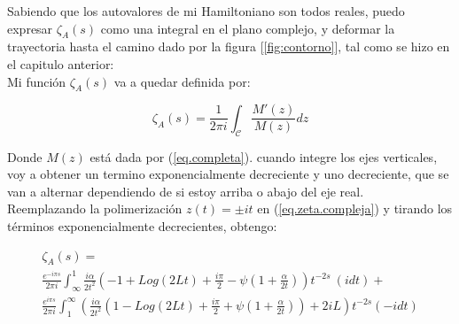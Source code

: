 Sabiendo que los autovalores de mi Hamiltoniano son todos reales, puedo expresar $\zeta _A (s)$ como una integral en el plano complejo, y deformar la trayectoria hasta el camino dado por la figura [\ref{fig:contorno}], tal como se hizo en el capitulo anterior: \\

Mi función $ \zeta _A (s) $ va a quedar definida por:

\begin{equation}
\zeta _A (s) = 
\frac{1}{2 \pi i} 
\int _{\mathcal{C}}
\frac{M ' ( z ) }{ M ( z ) } d z
\label{eq.zeta.compleja}
\end{equation}

Donde $M ( z )$ está dada por (\ref{eq.completa}).
cuando integre los ejes verticales, voy a obtener un termino exponencialmente decreciente y uno decreciente, que se van a alternar dependiendo de si estoy arriba o abajo del eje real. \\

Reemplazando la polimerización $ z (t) = \pm i t$ en (\ref{eq.zeta.compleja}) y tirando los términos exponencialmente decrecientes, obtengo:

\begin{comment}

\begin{equation}
\begin{array}{c}
    \zeta _A (s) = \\
     \frac{1}{2 \pi i} \int _{\infty} ^{1}
     \frac{ i \alpha }{2 t^2} 
     \left(
      1 + \frac{i \pi}{2} + Log[2 t] + \psi (1 + \frac{\beta}{2 t})
     \right)
     t ^{-2s}
     e ^{- i \pi s} (i dt) + \\
     \frac{1}{2 \pi i} \int _{\infty} ^{1} 
     \left(
     2 + \frac{\beta}{2 t^2}
     \left(
     1 + \frac{i \pi}{2} - Log[2 t] - \psi (1+ \frac{\beta}{2 t})
     \right)
     t ^{-2s}
     e ^{ i \pi s} (-i dt)
     \right)     
\end{array}
\end{equation}

\end{comment}

\begin{equation}
\begin{array}{c}
    \zeta _A (s) = \\
     \frac{e^{-i \pi s}}{2 \pi i} \int _{\infty} ^{1}
     \frac{ i \alpha}{2 t^2}
     \left(
     - 1 + Log(2 L t) + \frac{i \pi}{2}  - \psi (1+\frac{\alpha}{2 t})
     \right)
     t^{-2 s}
      \ 
     (i dt) + \\
     \frac{e^{i \pi s}}{2 \pi i} \int _1 ^{\infty}
	\left(      
     \frac{ i \alpha}{2  t^2}
     \left(
     1 - Log(2 L t) + \frac{i \pi}{2} + \psi (1 + \frac{\alpha}{2 t}) 
      
     \right)
     + 2 i L
     \right)
     t^{-2 s}
     (-i dt)
     
\end{array}
\end{equation}


